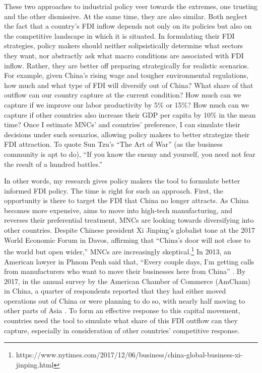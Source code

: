 These two approaches to industrial policy veer towards the extremes, one
trusting and the other dismissive. At the same time, they are also similar. Both
neglect the fact that a country's FDI inflow depends not only on its policies
but also on the competitive landscape in which it is situated. In formulating their
FDI strategies, policy makers should neither solipsistically determine what
sectors they want, nor abstractly ask what macro conditions are associated with
FDI inflow. Rather, they are better off preparing strategically for realistic
scenarios. For example, given China's rising wage and tougher environmental
regulations, how much and what type of FDI will diversify out of China? What
share of that outflow can our country capture at the current condition? How much
can we capture if we improve our labor productivity by 5\% or 15\%? How much can
we capture if other countries also increase their GDP per capita by 10\% in the
mean time? Once I estimate MNCs' and countries' preference, I can simulate their
decisions under such scenarios, allowing policy makers to better strategize
their FDI attraction. To quote Sun Tzu's ``The Art of War'' (as the business
community is apt to do), ``If you know the enemy and yourself, you need not fear
the result of a hundred battles.''

In other words, my research gives policy makers the tool to formulate better
informed FDI policy. The time is right for such an approach. First, the
opportunity is there to target the FDI that China no longer attracts. As China
becomes more expensive, aims to move into high-tech manufacturing, and reverses
their preferential treatment, MNCs are looking towards diversifying into other
countries. Despite Chinese president Xi Jinping's globalist tone at the 2017
World Economic Forum in Davos, affirming that ``China's door will not close to
the world but open wider,'' MNCs are increasingly
skeptical.\footnote{https://www.nytimes.com/2017/12/06/business/china-global-business-xi-jinping.html}
In 2013, an American lawyer in Phnom Penh said that, ``Every couple days, I'm
getting calls from manufacturers who want to move their businesses here from
China'' \citep{Bradsher2013}. By 2017, in the annual survey by the American
Chamber of Commerce (AmCham) in China, a quarter of respondents reported that
they had either moved operations out of China or were planning to do so, with
nearly half moving to other parts of Asia \citep{AmCham2018}. To form an
effective response to this capital movement, countries need the tool to simulate
what share of this FDI outflow can they capture, especially in consideration of
other countries' competitive response.

